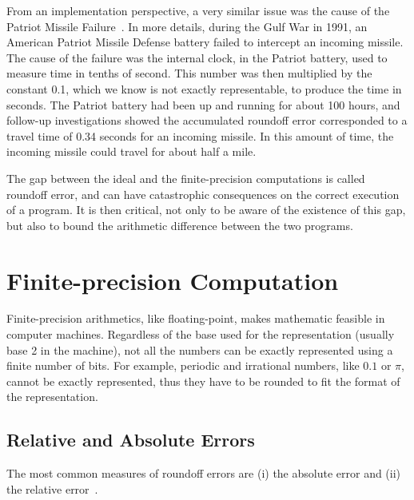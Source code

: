 From an implementation perspective, a very similar issue was the cause of the Patriot Missile Failure~\cite{patriot}.
%
In more details, during the Gulf War in 1991, an American Patriot Missile Defense battery failed to intercept an incoming missile.
%
The cause of the failure was the internal clock, in the Patriot battery, used to measure time in tenths of second.
%
This number was then multiplied by the constant 0.1, which we know is not exactly representable, to produce the time in seconds.
%
The Patriot battery had been up and running for about 100 hours, and follow-up investigations showed the accumulated roundoff error corresponded to a travel time of 0.34 seconds for an incoming missile. 
%
In this amount of time, the incoming missile could travel for about half a mile.

%
The gap between the ideal and the finite-precision computations is called roundoff error, and can have catastrophic consequences on the correct execution of a program.
%
It is then critical, not only to be aware of the existence of this gap, but also to bound the arithmetic difference between the two programs.
%
\section{Finite-precision Computation}
%

Finite-precision arithmetics, like floating-point, makes mathematic feasible in computer machines. 
%
Regardless of the base used for the representation (usually base 2 in the machine), not all the numbers can be exactly represented using a finite number of bits.
%
For example, periodic and irrational numbers, like $0.1$ or $\pi$, cannot be exactly represented, thus they have to be rounded to fit the format of the representation. 
%
%
\subsection{Relative and Absolute Errors}
%
The most common measures of roundoff errors are (i) the absolute error and (ii) the relative error~\cite{higham2002accuracy}.
%

